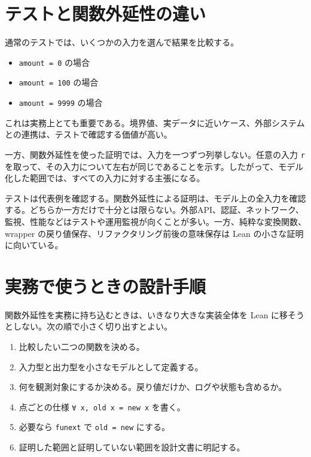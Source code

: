 \section{テストと関数外延性の違い}

通常のテストでは、いくつかの入力を選んで結果を比較する。

\begin{itemize}
\item \texttt{amount = 0} の場合
\item \texttt{amount = 100} の場合
\item \texttt{amount = 9999} の場合
\end{itemize}

これは実務上とても重要である。境界値、実データに近いケース、外部システムとの連携は、テストで確認する価値が高い。

一方、関数外延性を使った証明では、入力を一つずつ列挙しない。任意の入力 \texttt{r} を取って、その入力について左右が同じであることを示す。したがって、モデル化した範囲では、すべての入力に対する主張になる。

\begin{softwarebox}
テストは代表例を確認する。関数外延性による証明は、モデル上の全入力を確認する。どちらか一方だけで十分とは限らない。外部API、認証、ネットワーク、監視、性能などはテストや運用監視が向くことが多い。一方、純粋な変換関数、wrapper の戻り値保存、リファクタリング前後の意味保存は Lean の小さな証明に向いている。
\end{softwarebox}

\section{実務で使うときの設計手順}

関数外延性を実務に持ち込むときは、いきなり大きな実装全体を Lean に移そうとしない。次の順で小さく切り出すとよい。

\begin{enumerate}
\item 比較したい二つの関数を決める。
\item 入力型と出力型を小さなモデルとして定義する。
\item 何を観測対象にするか決める。戻り値だけか、ログや状態も含めるか。
\item 点ごとの仕様 \texttt{∀ x, old x = new x} を書く。
\item 必要なら \texttt{funext} で \texttt{old = new} にする。
\item 証明した範囲と証明していない範囲を設計文書に明記する。
\end{enumerate}

